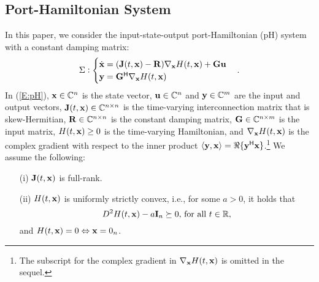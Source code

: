 \subsection{Port-Hamiltonian System} \label{sec_pH}
In this paper, we consider the input-state-output port-Hamiltonian (pH) system with a constant damping matrix:
\begin{equation} \label{E:pH} 
    \Sigma: \begin{cases}
        \dot{\mathbf{x}} = (\mathbf{J}(t, \mathbf{x}) - \mathbf{R}) \nabla_{\mathbf{x}} H(t, \mathbf{x}) + \mathbf{G} \mathbf{u} \\
    \mathbf{y} = \mathbf{G}^{\mathsf{H}} \nabla_{\mathbf{x}} H(t, \mathbf{x})
    \end{cases}.
\end{equation}
In (\ref{E:pH}), $\mathbf{x} \in \mathbb{C}^n$ is the state vector, $\mathbf{u} \in \mathbb{C}^n$ and $\mathbf{y} \in \mathbb{C}^m$ are the input and output vectors, %
$\mathbf{J}(t, \mathbf{x}) \in \mathbb{C}^{n\times n}$ is the time-varying interconnection matrix that is skew-Hermitian,
$\mathbf{R} \in \mathbb{C}^{n\times n}$ is the constant damping matrix, $\mathbf{G} \in \mathbb{C}^{n\times m}$ is the input matrix, $H(t, \mathbf{x}) \geq 0$ is the time-varying Hamiltonian, and $\nabla_{\mathbf{x}} H(t, \mathbf{x})$ is the complex gradient with respect to the inner product $\langle \mathbf{y}, \mathbf{x} \rangle = \Re\{\mathbf{y}^{\mathsf{H}} \mathbf{x} \}$.\footnote{The subscript for the complex gradient in $\nabla_{\mathbf{x}}H(t, \mathbf{x})$ is omitted in the sequel.} We assume the following:
\begin{enumerate}
    \item[(i)] $\mathbf{J}(t, \mathbf{x})$ is full-rank.
    \item[(ii)] $H(t, \mathbf{x})$ is uniformly strictly convex, i.e., for some $a > 0$, it holds that
    \begin{equation} \label{E:strictly_convex}
        D^2 H(t, \mathbf{x}) - a \mathbf{I}_n \succeq 0,\, \text{for all $t \in \mathbb{R}$},
\end{equation}
    and $H(t, \mathbf{x}) = 0 \Leftrightarrow \mathbf{x} = 0_n$.
\end{enumerate}

